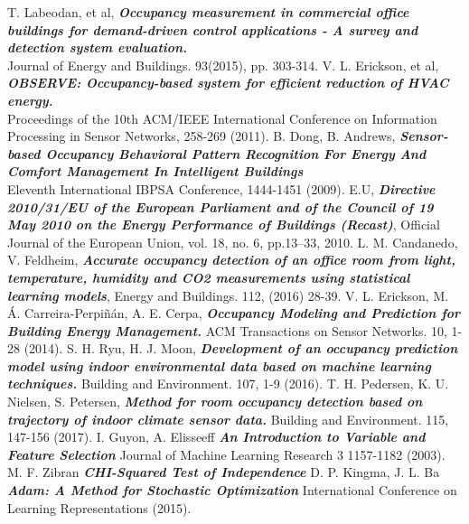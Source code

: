 \documentclass[conference]{IEEEtran}
\begin{document}
\begin{thebibliography}{1}
T. Labeodan, et al, \emph{\textbf{Occupancy   measurement   in   commercial   office  
buildings   for   demand-driven   control   applications   -   A   survey   and   detection   system   evaluation.}}\\  
Journal of Energy and Buildings. 93(2015), pp. 303-314.
V. L. Erickson, et al,    \emph{\textbf{OBSERVE: Occupancy-based system for efficient reduction of HVAC energy.}}\\Proceedings   of   the   10th   ACM/IEEE   International   Conference  
on Information Processing in Sensor Networks, 258-269 (2011).
B.   Dong,   B.   Andrews, \emph{\textbf{Sensor-based   Occupancy   Behavioral   Pattern   Recognition   For   Energy  
And   Comfort   Management   In   Intelligent   Buildings}}\\Eleventh   International   IBPSA   Conference,  
1444-1451 (2009).
E.U, \emph{\textbf{Directive 2010/31/EU of the European Parliament and of the Council of 19
May 2010 on the Energy Performance of Buildings (Recast)}}, Official Journal of the
European Union, vol. 18, no. 6, pp.13–33, 2010.
L. M. Candanedo, V. Feldheim, \emph{\textbf{Accurate occupancy detection of an office room from light, temperature, humidity and CO2 measurements using statistical learning models}}, Energy and Buildings. 112, (2016) 28-39.
V. L. Erickson, M. Á. Carreira-Perpiñán, A. E. Cerpa, \emph{\textbf{Occupancy Modeling and Prediction for Building Energy Management.}} ACM Transactions on Sensor Networks. 10, 1-28 (2014).
S. H. Ryu, H. J. Moon, \emph{\textbf{Development of an occupancy prediction model using indoor environmental data based on machine learning techniques.}} Building and Environment. 107, 1-9 (2016).
T. H. Pedersen, K. U. Nielsen, S. Petersen, \emph{\textbf{Method for room occupancy detection based on trajectory of indoor climate sensor data.}} Building and Environment. 115, 147-156 (2017).
I. Guyon, A. Elisseeff  \emph{\textbf{An Introduction to Variable and Feature Selection}}
Journal of Machine Learning Research 3  1157-1182 (2003).
M. F. Zibran
\emph{\textbf{CHI-Squared Test of Independence}}
D. P. Kingma, J. L. Ba
\emph{\textbf{Adam: A Method for Stochastic Optimization }}
International Conference on Learning Representations (2015).
\end{thebibliography}




\end{document}
